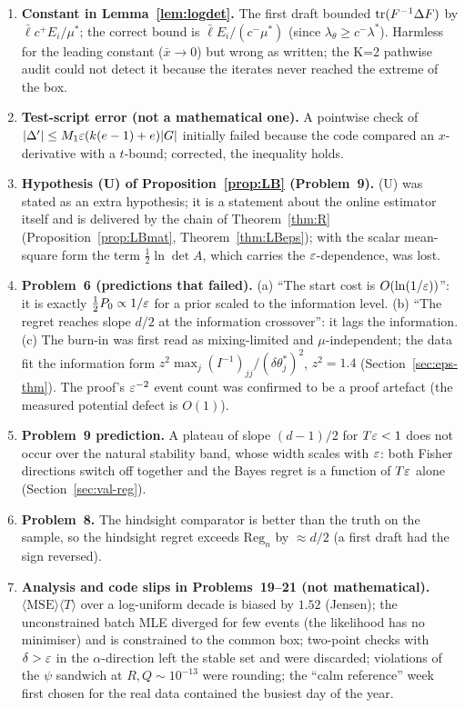 \begin{enumerate}[nosep]
\item \textbf{Constant in Lemma~\ref{lem:logdet}.} The first draft bounded $\operatorname{tr}(F^{-1}\Delta F)$ by $\bar\ell c^+E_i/\mu^*$; the correct bound is $\bar\ell E_i/(c^-\mu^*)$ (since $\lambda_\theta\ge c^-\lambda^*$). Harmless for the leading constant ($\bar x\to0$) but wrong as written; the K=2 pathwise audit could not detect it because the iterates never reached the extreme of the box.
\item \textbf{Test-script error (not a mathematical one).} A pointwise check of $|\Delta'|\le M_1\varepsilon(k(e-1)+e)|G|$ initially failed because the code compared an $x$-derivative with a $t$-bound; corrected, the inequality holds.
\item \textbf{Hypothesis (U) of Proposition~\ref{prop:LB} (Problem~9).} (U) was stated as an extra hypothesis; it is a statement about the online estimator itself and is delivered by the chain of Theorem~\ref{thm:R} (Proposition~\ref{prop:LBmat}, Theorem~\ref{thm:LBeps}); with the scalar mean-square form the term $\tfrac12\ln\det A$, which carries the $\varepsilon$-dependence, was lost.
\item \textbf{Problem~6 (predictions that failed).} (a) ``The start cost is $O(\ln(1/\varepsilon))$'': it is exactly $\tfrac12P_0\propto1/\varepsilon$ for a prior scaled to the information level. (b) ``The regret reaches slope $d/2$ at the information crossover'': it lags the information. (c) The burn-in was first read as mixing-limited and $\mu$-independent; the data fit the information form $z^2\max_j(I^{-1})_{jj}/(\delta\theta_j^*)^2$, $z^2=1.4$ (Section~\ref{sec:eps-thm}). The proof's $\varepsilon^{-2}$ event count was confirmed to be a proof artefact (the measured potential defect is $O(1)$).
\item \textbf{Problem~9 prediction.} A plateau of slope $(d-1)/2$ for $T\varepsilon<1$ does not occur over the natural stability band, whose width scales with $\varepsilon$: both Fisher directions switch off together and the Bayes regret is a function of $T\varepsilon$ alone (Section~\ref{sec:val-reg}).
\item \textbf{Problem~8.} The hindsight comparator is better than the truth on the sample, so the hindsight regret exceeds $\mathrm{Reg}_n$ by $\approx d/2$ (a first draft had the sign reversed).
\item \textbf{Analysis and code slips in Problems~19--21 (not mathematical).} $\langle\mathrm{MSE}\rangle\langle T\rangle$ over a log-uniform decade is biased by $1.52$ (Jensen); the unconstrained batch MLE diverged for few events (the likelihood has no minimiser) and is constrained to the common box; two-point checks with $\delta>\varepsilon$ in the $\alpha$-direction left the stable set and were discarded; violations of the $\psi$ sandwich at $R,Q\sim10^{-13}$ were rounding; the ``calm reference'' week first chosen for the real data contained the busiest day of the year.
\end{enumerate}

